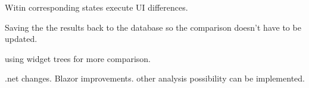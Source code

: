 Witin corresponding states execute UI differences.

Saving the the results back to the database so the comparison doesn't have to be updated.

using widget trees for more comparison.

.net changes.
Blazor improvements. 
other analysis possibility can be implemented. 